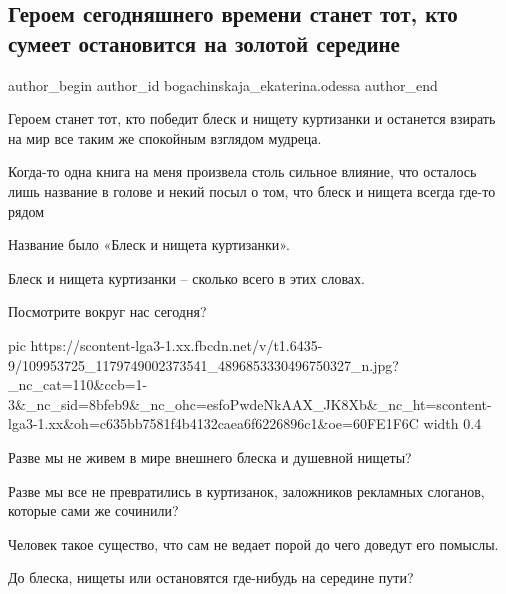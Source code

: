  
 
 
 
 
 
\subsection{Героем сегодняшнего времени станет тот, кто сумеет остановится на золотой середине}
\label{sec:21_07_2020.fb.bogachinskaja_ekaterina.odessa.1.geroj_mudrec}
 
\ifcmt
 author_begin
   author_id bogachinskaja_ekaterina.odessa
 author_end
\fi

Героем станет тот, кто победит блеск и нищету куртизанки и останется взирать на мир все таким же спокойным взглядом мудреца.

Когда-то одна книга на меня произвела столь сильное влияние, что осталось лишь
название в голове и некий посыл о том, что блеск и нищета всегда где-то рядом 

Название было «Блеск и нищета куртизанки».

Блеск и нищета куртизанки – сколько всего в этих словах. 

Посмотрите вокруг нас сегодня?

\ifcmt
  pic https://scontent-lga3-1.xx.fbcdn.net/v/t1.6435-9/109953725_1179749002373541_4896853330496750327_n.jpg?_nc_cat=110&ccb=1-3&_nc_sid=8bfeb9&_nc_ohc=esfoPwdeNkAAX_JK8Xb&_nc_ht=scontent-lga3-1.xx&oh=c635bb7581f4b4132caea6f6226896c1&oe=60FE1F6C
  width 0.4
\fi

Разве мы не живем в мире внешнего блеска и душевной нищеты?

Разве мы все не превратились в куртизанок, заложников рекламных слоганов,
которые сами же сочинили?

Человек такое существо, что сам не ведает порой до чего доведут его помыслы. 

До блеска, нищеты или остановятся где-нибудь на середине пути?

